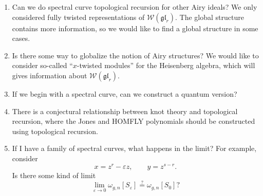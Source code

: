 \documentclass[leqno, openany]{memoir}
\theoremstyle{definition}
\theoremstyle{remark}
\theoremstyle{plain}
\theoremstyle{definition}
\theoremstyle{remark}
\newcommand{\ep}{\varepsilon}
\newcommand{\mc}[1]{\mathcal{#1}}
\newcommand{\mf}[1]{\mathfrak{#1}}
\begin{document}
\begin{enumerate}
    \item Can we do spectral curve topological recursion for other Airy ideals? We only considered fully twisted representations of $\mc{W}(\mf{gl}_r)$. The global structure contains more information, so we would like to find a global structure in some cases.
    \item Is there some way to globalize the notion of Airy structures? We would like to consider so-called ``$x$-twisted modules'' for the Heisenberg algebra, which will gives information about $\mc{W}(\mf{gl}_r)$.
    \item If we begin with a spectral curve, can we construct a quantum version?
    \item There is a conjectural relationship between knot theory and topological recursion, where the Jones and HOMFLY polynomials should be constructed using topological recursion.
    \item If I have a family of spectral curves, what happens in the limit? For example, consider
        \[ x = z^r - \ep z, \qquad y = z^{s-r}. \]
        Is there some kind of limit
        \[ \lim_{\ep \to 0} \omega_{g, n}[S_{\ep}] \overset{?}{=} \omega_{g, n}[S_0]? \]
\end{enumerate}


\printbibliography
\end{document}
